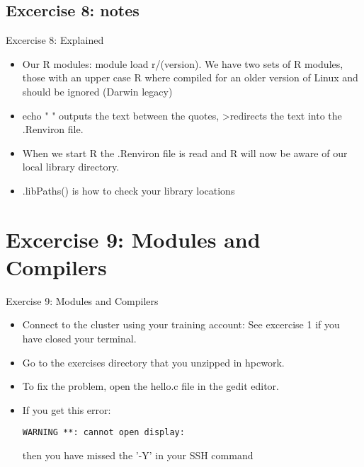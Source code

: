 \subsection{Excercise 8: notes}
\begin{frame}[fragile]{Excercise 8: Explained}
\begin{itemize}
\item Our R modules: module load r/(version). We have two sets of R modules, those with an upper case R where compiled for an older version of Linux and should be ignored (Darwin legacy)
\item echo " " outputs the text between the quotes, \textgreater redirects the text into the .Renviron file.
\item When we start R the .Renviron file is read and R will now be aware of our local library directory.
\item .libPaths() is how to check your library locations 
\end{itemize}
\end{frame}

\section{Excercise 9: Modules and Compilers}
\begin{frame}[fragile]{Exercise 9: Modules and Compilers}
\begin{itemize}
\item{Connect to the cluster using your training account: See excercise 1 if you have closed your terminal.}
\item{Go to the \alert{exercises} directory that you unzipped in hpcwork.}
\item{To fix the problem, open the \alert{hello.c} file in the \alert{gedit} editor.}
\item{If you get this error: \begin{verbatim}WARNING **: cannot open display:\end{verbatim} then you have missed the '-Y' in your SSH command}
\end{itemize}
\end{frame}
 
